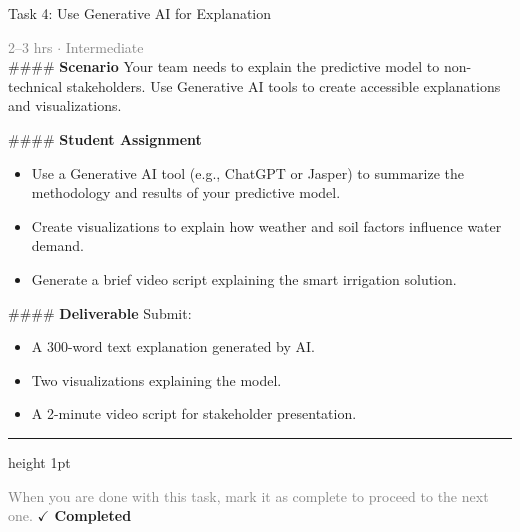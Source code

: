 \documentclass[10pt,a4paper]{article}
\begin{document}
\begin{taskbox}{Task 4: Use Generative AI for Explanation}

    {\small \textcolor{gray}{2--3 hrs $\cdot$ Intermediate}}\\[12pt]

    \#\#\#\# \textbf{Scenario}  
Your team needs to explain the predictive model to non-technical stakeholders. Use Generative AI tools to create accessible explanations and visualizations.

\#\#\#\# \textbf{Student Assignment}  
\begin{itemize}
    \item Use a Generative AI tool (e.g., ChatGPT or Jasper) to summarize the methodology and results of your predictive model.
    \item Create visualizations to explain how weather and soil factors influence water demand.
    \item Generate a brief video script explaining the smart irrigation solution.
\end{itemize}

\#\#\#\# \textbf{Deliverable}  
Submit:
\begin{itemize}
    \item A 300-word text explanation generated by AI.
    \item Two visualizations explaining the model.
    \item A 2-minute video script for stakeholder presentation.\par
\end{itemize}

    \vspace{16pt}

    \textcolor{cardBorder}{\hrule height 1pt}\vspace{8pt}

    \small \textcolor{gray}{When you are done with this task, mark it as complete to proceed to the next one.} \hfill \textbf{\textcolor{brandDark}{$\checkmark$ Completed}}

\end{taskbox}
\end{document}
